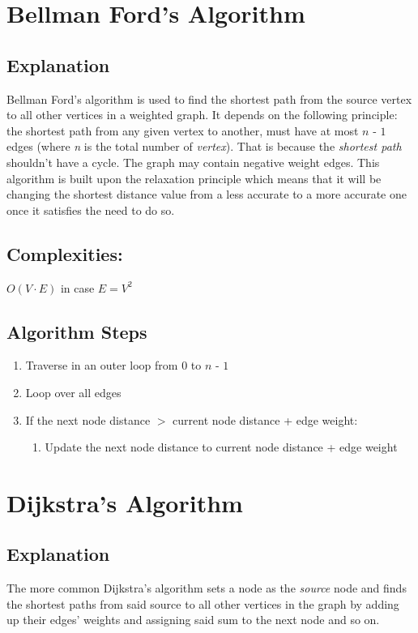 \documentclass[]{article}
\begin{document}
\section{Bellman Ford's Algorithm}
	\subsection{Explanation}
	\par Bellman Ford's algorithm is used to find the shortest path from the source vertex to all other vertices in a weighted graph. It depends on the following principle: the shortest path from any given vertex to another, must have at most $\textit{n - 1}$ edges (where \textit{n} is the total number of \textit{vertex}). That is because the \textit{shortest path} shouldn't have a cycle. The graph may contain negative weight edges. This algorithm is built upon the relaxation principle which means that it will be changing the shortest distance value from a less accurate to a more accurate one once it satisfies the need to do so\cite{ShortestPathAlgorithms}.
	
	\subsection{Complexities:}
	\textit{$O(V \cdot E)$} in case \textit{$E=V^2$}

	\subsection{Algorithm Steps}
	\begin{enumerate}
		\item Traverse in an outer loop from 0 to $\textit{n - 1}$
		\item Loop over all edges
		\item If the next node distance $>$ current node distance + edge weight:
		\begin{enumerate}
			\item Update the next node distance to current node distance + edge weight
		\end{enumerate}
	\end{enumerate}

\section{Dijkstra's Algorithm}
	\subsection{Explanation}
	\par The more common Dijkstra's algorithm sets a node as the \textit{source} node and finds the shortest paths from said source to all other vertices in the graph by adding up their edges' weights and assigning said sum to the next node and so on\cite{ShortestPathAlgorithms}.
	
\end{document}
